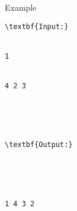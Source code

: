 Example
\begin{verbatim}
\textbf{Input:}


1


4 2 3





\textbf{Output:}





1 4 3 2


\end{verbatim}